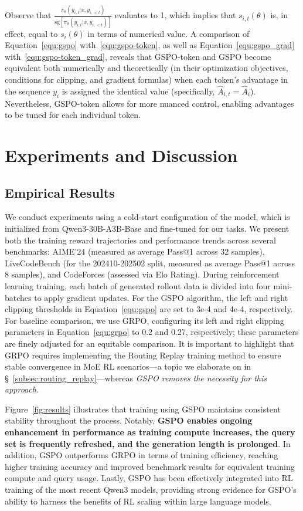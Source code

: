 Observe that $\frac{ \pi_{\theta} (y_{i,t} | x, y_{i,<t}) }{ \mathrm{sg} \left[ \pi_{\theta} (y_{i,t} | x, y_{i,<t}) \right] }$ evaluates to 1, which implies that $s_{i,t}(\theta)$ is, in effect, equal to $s_{i}(\theta)$ in terms of numerical value.
A comparison of Equation~\eqref{equ:gspo} with~\eqref{equ:gspo-token}, as well as Equation~\eqref{equ:gspo_grad} with~\eqref{equ:gspo-token_grad}, reveals that GSPO-token and GSPO become equivalent both numerically and theoretically (in their optimization objectives, conditions for clipping, and gradient formulas) when each token's advantage in the sequence $y_i$ is assigned the identical value (specifically, $\widehat{A}_{i,t} = \widehat{A}_{i}$). Nevertheless, GSPO-token allows for more nuanced control, enabling advantages to be tuned for each individual token.

\section{Experiments and Discussion}

\subsection{Empirical Results}

We conduct experiments using a cold-start configuration of the model, which is initialized from Qwen3-30B-A3B-Base and fine-tuned for our tasks. We present both the training reward trajectories and performance trends across several benchmarks: AIME'24 (measured as average Pass@1 across 32 samples), LiveCodeBench (for the 202410-202502 split, measured as average Pass@1 across 8 samples), and CodeForces (assessed via Elo Rating). During reinforcement learning training, each batch of generated rollout data is divided into four mini-batches to apply gradient updates. For the GSPO algorithm, the left and right clipping thresholds in Equation~\eqref{equ:gspo} are set to 3e-4 and 4e-4, respectively. For baseline comparison, we use GRPO, configuring its left and right clipping parameters in Equation~\eqref{equ:grpo} to 0.2 and 0.27, respectively; these parameters are finely adjusted for an equitable comparison. It is important to highlight that GRPO requires implementing the Routing Replay training method to ensure stable convergence in MoE RL scenarios—a topic we elaborate on in \S~\ref{subsec:routing_replay}—whereas \textit{GSPO removes the necessity for this approach}.

Figure~\ref{fig:results} illustrates that training using GSPO maintains consistent stability throughout the process. Notably, \textbf{GSPO enables ongoing enhancement in performance as training compute increases, the query set is frequently refreshed, and the generation length is prolonged}. In addition, GSPO outperforms GRPO in terms of training efficiency, reaching higher training accuracy and improved benchmark results for equivalent training compute and query usage. Lastly, GSPO has been effectively integrated into RL training of the most recent Qwen3 models, providing strong evidence for GSPO's ability to harness the benefits of RL scaling within large language models.

